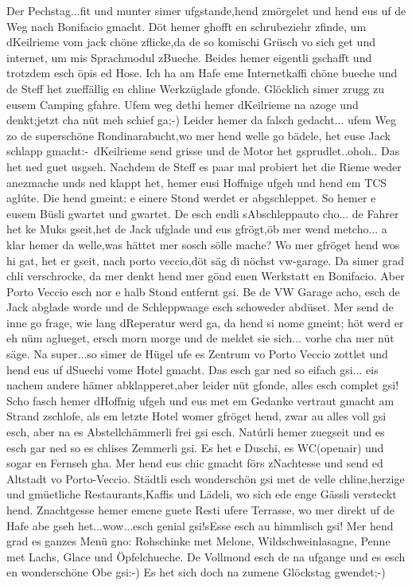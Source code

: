 Der Pechstag...fit und munter simer ufgstande,hend zmörgelet und hend eus uf de Weg nach Bonifacio gmacht.
Döt hemer ghofft en schrubeziehr zfinde, um dKeilrieme vom jack chöne zflicke,da de so komischi Grüsch vo sich get und internet, um mis Sprachmodul zBueche.
Beides hemer eigentli gschafft und trotzdem esch öpis ed Hose.
Ich ha am Hafe eme Internetkaffi chöne bueche und de Steff het zueffällig en chline Werkzüglade gfonde.
Glöcklich simer zrugg zu eusem Camping gfahre.
Ufem weg dethi hemer dKeilrieme na azoge und denkt;jetzt cha nüt meh schief ga;-) Leider hemer da falsch gedacht...
ufem Weg zo de superschöne Rondinarabucht,wo mer hend welle go bädele, het euse Jack schlapp gmacht:-\ dKeilrieme send grisse und de Motor het gsprudlet..ohoh..
Das het ned guet usgseh.
Nachdem de Steff es paar mal probiert het die Rieme weder anezmache unds ned klappt het, hemer eusi Hoffnige ufgeh und hend em TCS aglúte.
Die hend gmeint: e einere Stond werdet er abgschleppet.
So hemer e eusem Büsli gwartet und gwartet.
De esch endli sAbschleppauto cho...
de Fahrer het ke Muks gseit,het de Jack ufglade und eus gfrögt,öb mer wend metcho...
a klar hemer da welle,was hättet mer sosch sölle mache? Wo mer gfröget hend wos hi gat, het er gseit, nach porto veccio,döt säg di nöchst vw-garage.
Da simer grad chli verschrocke, da mer denkt hend mer gönd enen Werkstatt en Bonifacio.
Aber Porto Veccio esch nor e halb Stond entfernt gsi.
Be de VW Garage acho, esch de Jack abglade worde und de Schleppwaage esch schoweder abdüset.
Mer send de inne go frage, wie lang dReperatur werd ga, da hend si nome gmeint; höt werd er eh nüm aglueget, ersch morn morge und de meldet sie sich...
vorhe cha mer nüt säge.
Na super...so simer de Hügel ufe es Zentrum vo Porto Veccio zottlet und hend eus uf dSuechi vome Hotel gmacht.
Das esch gar ned so eifach gsi...
eis nachem andere hämer abklapperet,aber leider nüt gfonde, alles esch complet gsi! Scho fasch hemer dHoffnig ufgeh und eus met em Gedanke vertraut gmacht am Strand zschlofe, als em letzte Hotel womer gfröget hend, zwar au alles voll gsi esch, aber na es Abstellchämmerli frei gsi esch.
Natúrli hemer zuegseit und es esch gar ned so es chlises Zemmerli gsi.
Es het e Duschi, es WC(openair) und sogar en Fernseh gha.
Mer hend eus chic gmacht förs zNachtesse und send ed Altstadt vo Porto-Veccio.
Städtli esch wonderschön gsi met de velle chline,herzige und gmüetliche Restaurants,Kaffis und Lädeli, wo sich ede enge Gässli versteckt hend.
Znachtgesse hemer emene guete Resti ufere Terrasse, wo mer direkt uf de Hafe abe gseh het...wow...esch genial gsi!sEsse esch au himmlisch gsi! Mer hend grad es ganzes Menü gno: Rohschinke met Melone, Wildschweinlasagne, Penne met Lachs, Glace und Öpfelchueche.
De Vollmond esch de na ufgange und es esch en wonderschöne Obe gsi:-) Es het sich doch na zumene Glöckstag gwendet;-)

